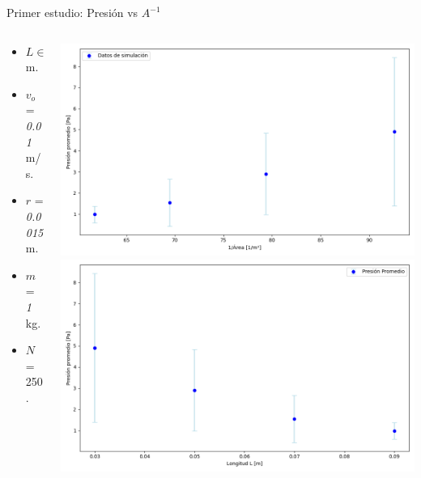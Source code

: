 \documentclass{beamer}
\begin{document}
\begin{frame}{Primer estudio: Presión vs $A^{-1}$}
  \begin{columns}
    \begin{column}{0.40\textwidth}
      \scriptsize {}
      \begin{itemize}
        \item $L \in \{ \textit{0.09}, \textit{0.007}, \textit{0.05}, \textit{0.03} \}$ m.
        \item $v_o$ = \textit{0.01} m/s.
        \item $r$ = \textit{0.0015} m.
        \item $m$ = \textit{1} kg.
        \item $N$ = 250.
      \end{itemize}
    \end{column}
    \begin{column}{0.60\textwidth}
      \includegraphics[width=1\linewidth]{photoMaterial/Presion_vs_area.png} %
      \includegraphics[width=1\linewidth]{photoMaterial/Presion_vs_L.png}
    \end{column}
  \end{columns}
\end{frame}
\end{document}
